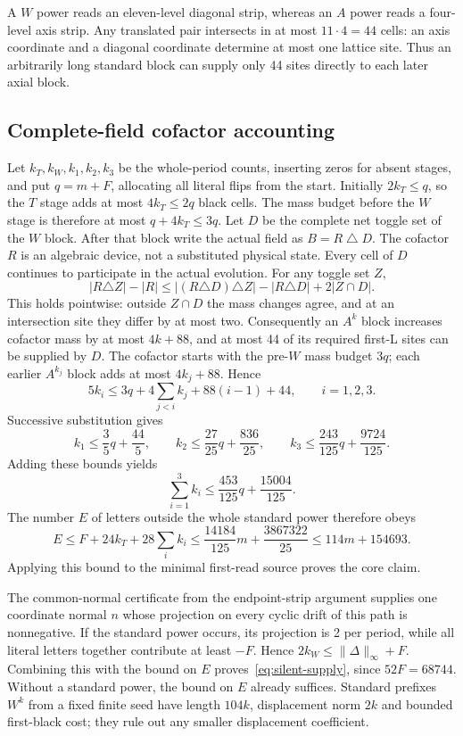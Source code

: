 A $W$ power reads an eleven-level diagonal strip, whereas an $A$ power
reads a four-level axis strip. Any translated pair intersects in at most
$11\cdot4=44$ cells: an axis coordinate and a diagonal coordinate determine
at most one lattice site. Thus an arbitrarily long standard block can supply
only 44 sites directly to each later axial block.

\subsection{Complete-field cofactor accounting}
Let $k_T,k_W,k_1,k_2,k_3$ be the whole-period counts, inserting zeros for
absent stages, and put $q=m+F$, allocating all literal flips from the
start. Initially $2k_T\le q$, so the $T$ stage adds at most
$4k_T\le2q$ black cells. The mass budget before the $W$ stage is therefore
at most $q+4k_T\le3q$.
Let $D$ be the complete net toggle set of the $W$ block. After that block
write the actual field as $B=R\mathbin{\triangle}D$. The cofactor $R$ is
an algebraic device, not a substituted physical state. Every cell of $D$
continues to participate in the actual evolution. For any toggle set $Z$,
\[
 |R\triangle Z|-|R|
 \le |(R\triangle D)\triangle Z|-|R\triangle D|+2|Z\cap D|.
\]
This holds pointwise: outside $Z\cap D$ the mass changes agree, and at an
intersection site they differ by at most two. Consequently an $A^k$ block
increases cofactor mass by at most $4k+88$, and at most 44 of its required
first-L sites can be supplied by $D$. The cofactor starts with the
pre-$W$ mass budget $3q$; each earlier $A^{k_j}$ block adds at most
$4k_j+88$. Hence
\[
 5k_i\le3q+4\sum_{j<i}k_j+88(i-1)+44,\qquad i=1,2,3.
\]
Successive substitution gives
\[
 k_1\le\frac35q+\frac{44}{5},\qquad
 k_2\le\frac{27}{25}q+\frac{836}{25},\qquad
 k_3\le\frac{243}{125}q+\frac{9724}{125}.
\]
Adding these bounds yields
\[
 \sum_{i=1}^3 k_i\le\frac{453}{125}q+\frac{15004}{125}.
\]
The number $E$ of letters outside the whole standard power therefore obeys
\[
 E\le F+24k_T+28\sum_i k_i
 \le\frac{14184}{125}m+\frac{3867322}{25}
 \le114m+154693.
\]
Applying this bound to the minimal first-read source proves the core claim.

The common-normal certificate from the endpoint-strip argument supplies one
coordinate normal $n$ whose projection on every cyclic drift of this path
is nonnegative. If the standard power occurs, its projection is 2 per
period, while all literal letters together contribute at least $-F$.
Hence $2k_W\le\|\Delta\|_\infty+F$. Combining this with the bound on $E$
proves~\eqref{eq:silent-supply}, since $52F=68744$. Without a standard
power, the bound on $E$ already suffices. Standard prefixes $W^k$ from a
fixed finite seed have length $104k$, displacement norm $2k$ and bounded
first-black cost; they rule out any smaller displacement coefficient.


